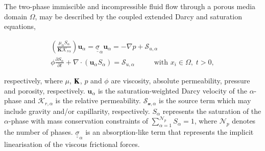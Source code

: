 \documentclass[preprint,authoryear,12pt]{elsarticle}
\begin{document}

The two-phase immiscible and incompressible fluid flow through a porous media domain $\Omega$, may be described by the coupled extended Darcy and saturation equations,

\begin{eqnarray}
\left(\displaystyle\frac{\mu_{\alpha}S_{\alpha}}{{\mathbf K}\mathcal{K}_{r\alpha}}\right) {\mathbf u}_{\alpha} = \underline{\underline{\sigma}}_{\alpha} {\mathbf u}_{\alpha} = -\nabla p + \mathcal{S}_{u,\alpha}\hspace{1cm} \label{eqn:darcy_eqn} \\ %
\phi\displaystyle\frac{\partial S_{\alpha} }{\partial t} +   \nabla \cdot \left( {\mathbf u}_{\alpha}  S_{\alpha}\right) =  \mathcal{S}_{u,\alpha}\hspace{1cm} \text{ with } x_{i}\in\Omega,\; t>0,\label{eqn:saturation_eqn}
\end{eqnarray} 

\noindent respectively, where $\mu$, ${\bf K}$, $p$ and $\phi$ are viscosity, absolute permeability, pressure and porosity, respectively. ${\mathbf u}_{\alpha}$ is the saturation-weighted Darcy velocity of the $\alpha$-phase and $\mathcal{K}_{r,\alpha}$ is the relative permeability. $\mathcal{S_{u,{\alpha}}}$ is the source term %
which may include gravity and/or capillarity, respectively. $S_{\alpha}$ represents the saturation of the $\alpha$-phase with mass conservation constraints of $\sum\limits_{\alpha=1}^{\mathcal{N}_{p}} S_{\alpha} = 1$, where $\mathcal{N}_{p}$ denotes the number of phases. $\underline{\underline{\sigma}}_{\alpha}$ is an absorption-like term that represents the implicit linearisation of the viscous frictional forces.
\end{document}
